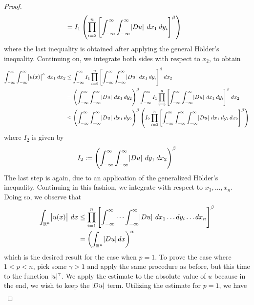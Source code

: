 \documentclass[10pt]{article}
\begin{document}
\begin{proof}
\begin{align*}
		&= I_1 \left( \prod\limits_{i=2}^{n}{\left[ \int_{-\infty}^{\infty}{\int_{-\infty}^{\infty}{\abs{Du} \: dx_1}} \: dy_i \right]^\beta} \right)
	\end{align*}
	where the last inequality is obtained after applying the general H\"older's inequality. Continuing on, we integrate both sides with respect to $x_2$, to obtain
	\begin{align*}
		\displaystyle \int_{-\infty}^{\infty}{\int_{-\infty}^{\infty}{\abs{u(x)}^\alpha \: dx_1} \: dx_2} &\leq \int_{-\infty}^{\infty}{ I_1 \prod\limits_{i=2}^{n}{\left[ \int_{-\infty}^{\infty}{\int_{-\infty}^{\infty}{\abs{Du} \: dx_1}} \: dy_i \right]^\beta} \: dx_2} \\
		&= \left(\int_{-\infty}^{\infty}{\int_{-\infty}^{\infty}{\abs{Du} \: dx_1} \: dy_2}\right)^\beta \int_{-\infty}^{\infty}{ I_1 \prod\limits_{i=3}^{n}{\left[ \int_{-\infty}^{\infty}{\int_{-\infty}^{\infty}{ \abs{Du} \: dx_1} \: dy_i} \right]^\beta} \: dx_2} \\
		&\leq \left(\int_{-\infty}^{\infty}{\int_{-\infty}^{\infty}{\abs{Du} \: dx_1} \: dy_2}\right)^\beta \left(I_2\prod\limits_{i=3}^{n}{\left[ \int_{-\infty}^{\infty}{ \int_{-\infty}^{\infty}{ \int_{-\infty}^{\infty}{\abs{Du} \: dx_1} \: dy_i} \: dx_2} \right]^\beta}\right)
	\end{align*}
	where $I_2$ is given by 
	\begin{equation*}
		\displaystyle I_2 := \left(\int_{-\infty}^{\infty}{\int_{-\infty}^{\infty}{ \abs{Du} \: dy_1} \: dx_2}\right)^\beta
	\end{equation*}
	The last step is again, due to an application of the generalized H\"older's inequality. Continuing in this fashion, we integrate with respect to $x_3, \dots, x_n$. Doing so, we observe that 
	\begin{align*}
		\displaystyle \int_{\mathbb{R}^n}{\abs{u(x)} \: dx} &\leq \prod\limits_{i = 1}^{n}{\left[ \int_{-\infty}^{\infty}\cdots\int_{-\infty}^{\infty}{\abs{Du} \: dx_1 \dots dy_i \dots dx_n} \right]^\beta} \\
		&= \left( \int_{\mathbb{R}^n}{\abs{Du} dx} \right)^\alpha
	\end{align*}
	which is the desired result for the case when $p = 1$. To prove the case where $1 < p < n$, pick some $\gamma > 1$ and apply the same procedure as before, but this time to the function $\abs{u}^\gamma$. We apply the estimate to the absolute value of $u$ because in the end, we wish to keep the $\abs{Du}$ term. Utilizing the estimate for $p = 1$, we have 
	\begin{align*}

\end{align*}
\end{proof}
\end{document}
